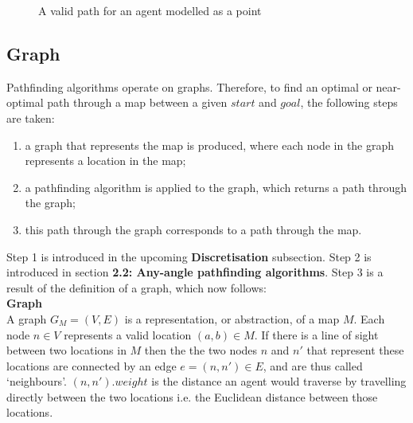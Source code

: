 \documentclass[12pt,notitlepage]{report}
\begin{document}
\begin{figure}[h]
    \centering
  \caption{A valid path for an agent modelled as a point}
\end{figure}

\subsection{Graph}

Pathfinding algorithms operate on graphs. Therefore, to find an optimal or near-optimal path through a map between a given $start$ and $goal$, the following steps are taken:
\begin{enumerate}
\item a graph that represents the map is produced, where each node in the graph represents a location in the map; 
\item a pathfinding algorithm is applied to the graph, which returns a path through the graph;
\item this path through the graph corresponds to a path through the map.
\end{enumerate}
Step 1 is introduced in the upcoming {\bfseries Discretisation} subsection. Step 2 is introduced in section {\bfseries 2.2: Any-angle pathfinding algorithms}. Step 3 is a result of the definition of a graph, which now follows:\\

\noindent
{\bfseries Graph}\\
\noindent
A graph $G_{M}=(V,E)$ is a representation, or abstraction, of a map $M$. Each node $n \in V$ represents a valid location $(a,b) \in M$. If there is a line of sight between two locations in $M$ then the the two nodes $n$ and $n'$ that represent these locations are connected by an edge $e=(n,n') \in E$, and are thus called `neighbours'. $(n,n').weight$ is the distance an agent would traverse by travelling directly between the two locations i.e. the Euclidean distance between those locations.
\end{document}
